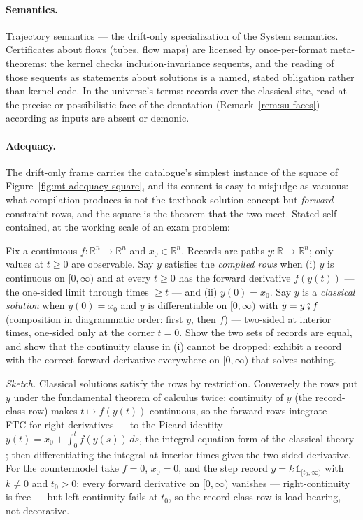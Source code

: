 \paragraph{Semantics.} Trajectory semantics --- the drift-only
specialization of the System semantics. Certificates about flows
(tubes, flow maps) are licensed by once-per-format meta-theorems: the
kernel checks inclusion-invariance sequents, and the reading of those
sequents as statements about solutions is a named, stated obligation
rather than kernel code. In the universe's terms: records over the
classical site, read at the precise or possibilistic face of the
denotation (Remark~\ref{rem:su-faces}) according as inputs are
absent or demonic.

\paragraph{Adequacy.} The drift-only frame carries the catalogue's
simplest instance of the square of
Figure~\ref{fig:mt-adequacy-square}, and its content is easy to
misjudge as vacuous: what compilation produces is not the textbook solution
concept but \emph{forward} constraint rows, and the square is the
theorem that the two meet. Stated self-contained, at the working
scale of an exam problem:

\begin{problem}
\label{prob:mt-ode}
Fix a continuous $f : \mathbb{R}^n \to \mathbb{R}^n$
and $x_0 \in \mathbb{R}^n$. Records are paths $y : \mathbb{R} \to
\mathbb{R}^n$; only values at $t \ge 0$ are observable. Say $y$
satisfies the \emph{compiled rows} when (i) $y$ is continuous on
$[0, \infty)$ and at every $t \ge 0$ has the forward derivative
$f(y(t))$ --- the one-sided limit through times $\ge t$ --- and (ii)
$y(0) = x_0$. Say $y$ is a \emph{classical solution} when $y(0) =
x_0$ and $y$ is differentiable on $[0,\infty)$ with $\dot y = y
\fatsemi f$ (composition in diagrammatic order: first $y$, then $f$)
--- two-sided at interior times, one-sided only at the
corner $t = 0$. Show the two sets of records are equal, and show
that the continuity clause in (i) cannot be dropped: exhibit a
record with the correct forward derivative everywhere on $[0,
\infty)$ that solves nothing.
\end{problem}

\emph{Sketch.} Classical solutions satisfy the rows by restriction.
Conversely the rows put $y$ under the fundamental theorem of
calculus twice: continuity of $y$ (the record-class row) makes $t
\mapsto f(y(t))$ continuous, so the forward rows integrate --- FTC
for right derivatives --- to the Picard identity $y(t) = x_0 +
\int_0^t f(y(s))\,ds$, the integral-equation form of the classical
theory \cite{coddington-levinson-1955, hartman-2002}; then
differentiating the integral at interior times gives the two-sided
derivative. For the countermodel take $f = 0$, $x_0 = 0$, and the
step record $y = k\,\mathds{1}_{[t_0, \infty)}$ with $k \neq 0$ and
$t_0 > 0$: every forward
derivative on $[0,\infty)$ vanishes --- right-continuity is free ---
but left-continuity fails at $t_0$, so the record-class row is
load-bearing, not decorative.

